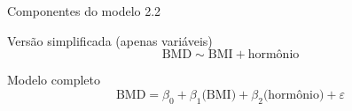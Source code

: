 \documentclass{beamer}
\begin{document}
\begin{frame}{\scriptsize Componentes do modelo 2.2}
  \begin{block}{\footnotesize Versão simplificada (apenas variáveis)}
    \footnotesize
    \begin{displaymath}
      \text{BMD} \sim \text{BMI} + \text{hormônio}
    \end{displaymath}
  \end{block}
  \bigskip
  \bigskip
  \begin{block}{Modelo completo}
    \footnotesize
    \begin{displaymath}
      \text{BMD} =\beta_0 + \beta_1 \text{(BMI)} + \beta_2 \text{(hormônio)} +\varepsilon
    \end{displaymath}
  \end{block}
  \vfill
\end{frame}
\end{document}
